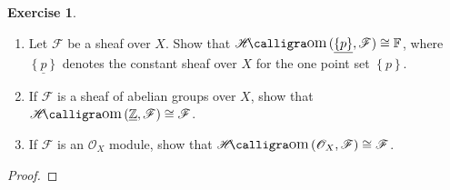 \documentclass[psamsfonts]{amsart}
\theoremstyle{definition}
\newtheorem{exer}[thm]{Exercise}
\theoremstyle{remark}
\newcommand{\Z}{\mathbb{Z}}
\newcommand{\F}{\mathbb{F}}
\newcommand{\set}[1]{\left\lbrace #1 \right\rbrace}
\newcommand{\enumbreak}{\ \\ \vspace{-\baselineskip}}
\DeclareMathOperator{\sheafhom}{\mathscr{H}\text{\kern -3pt {\calligra\large om}}\,}
\begin{document}
%
\begin{exer} \enumbreak
\begin{enumerate}
\item Let $\mathscr{F}$ be a sheaf over $X$. Show that $\sheafhom(\underline{\set{p}},\mathscr{F}) \cong \F$, where $\underline{\set{p}}$ denotes the constant sheaf over $X$ for the one point set $\set{p}$.
\item If $\mathscr{F}$ is a sheaf of abelian groups over $X$, show that $\sheafhom(\underline{\Z}, \mathscr{F}) \cong \mathscr{F}$.
\item If $\mathscr{F}$ is an $\mathscr{O}_X$ module, show that $\sheafhom(\mathscr{O}_X, \mathscr{F}) \cong \mathscr{F}$.
\end{enumerate}
\end{exer}
%
\begin{proof}

\end{proof}
%
\end{document}
